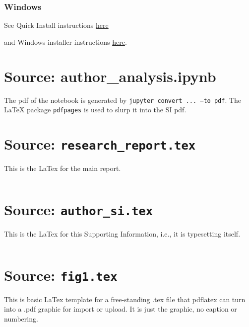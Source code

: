 \documentclass[letter,doc,natbib,11pt]{apa7}  %
\begin{document}
\subsubsection{Windows}


See Quick Install instructions 
\href{https://www.tug.org/texlive/quickinstall.html}{here}

and Windows installer instructions
\href{https://www.tug.org/texlive/acquire-netinstall.html}{here}.



\newpage
\normalsize
\section{Source: author\_analysis.ipynb}

The pdf of the notebook is generated by {\tt jupyter convert ... --to pdf}. The
LaTeX{} package {\tt pdfpages} is used to slurp it into the SI pdf.




\newpage
\section{Source: {\tt research\_report.tex}}
This is the LaTex{} for the main report. 

\inputminted{latex}{apa_ms.tex}


\newpage
\section{Source: {\tt author\_si.tex}}

This is the LaTex{} for this Supporting Information, i.e., it is 
typesetting itself. 

\inputminted{latex}{apa_si.tex}


\newpage
\section{Source: {\tt fig1.tex}}
This is basic LaTex{} template for a free-standing .tex file that pdflatex can turn
into a .pdf graphic for import or upload. It is just the graphic, no caption or numbering.
\end{document}
